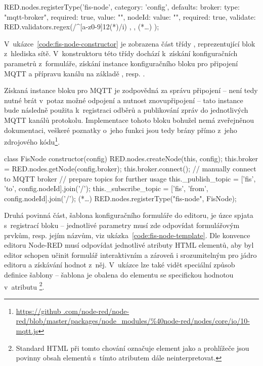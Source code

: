 \begin{code}[
    language=Javascript,
    label=code:fis-node-editor,
    caption={Registrace vlastního bloku do editoru sítě v~nástroji Node-RED.}
]
RED.nodes.registerType('fis-node', {
    category: 'config',
    defaults: {
        broker: {type: "mqtt-broker", required: true, value: ""},
        nodeId: {
            value: "", required: true,
            validate: RED.validators.regex(/^[a-z0-9]{12}(*\textdollar*)/i)
        },
    },
    (*\ldots*)
});
\end{code}

V~ukázce~\ref{code:fis-node-constructor} je zobrazena část třídy , reprezentující blok z~hlediska sítě.
V~konstruktoru této třídy dochází k~získání konfiguračních
parametrů z~formuláře, získání instance konfiguračního bloku pro připojení MQTT a přípravu kanálu na základě
, resp. .

Získaná instance bloku pro MQTT je zodpovědná za správu připojení -- není tedy nutné brát v~potaz možné odpojení a
nutnost znovupřipojení -- tato instance bude následně použita k~registraci odběrů a publikování zpráv do jednotlivých
MQTT kanálů protokolu.
Implementace tohoto bloku bohužel nemá zveřejněnou dokumentaci, veškeré poznatky o~jeho funkci jsou tedy brány přímo
z~jeho zdrojového kódu\footnote{\url{https://github
.com/node-red/node-red/blob/master/packages/node_modules/\%40node-red/nodes/core/io/10-mqtt.js}}.

\begin{code}[
    language=Javascript,
    numbers=left,
    label=code:fis-node-constructor,
    caption={Část konstruktoru třídy \ic{FisNode} obluhující připojení brokeru MQTT a přípravu kanálů pro komunikaci.}
]
class FisNode {
    constructor(config) {
        RED.nodes.createNode(this, config);
        this.broker = RED.nodes.getNode(config.broker);
        this.broker.connect(); // manually connect to MQTT broker
        // prepare topics for further usage
        this._publish_topic = ['fis', 'to', config.nodeId].join('/');
        this._subscribe_topic = ['fis', 'from', config.nodeId].join('/');
    }
    (*\ldots*)
    RED.nodes.registerType("fis-node", FisNode);
}
\end{code}


Druhá povinná část, šablona konfiguračního formuláře do editoru, je úzce spjata s~registrací bloku -- jednotlivé
parametry musí zde odpovídat formulářovým prvkům, resp. jejím názvům, viz ukázka~\ref{code:fis-node-template}.
Dle konvence editoru Node-RED musí odpovídat jednotlivé atributy HTML elementů, aby byl editor schopen učinit
formulář interaktivním a zároveň i srozumitelným pro jádro editoru a získávání hodnot z~něj.
V~ukázce lze také vidět speciální způsob definice šablony -- šablona je obalena do elementu  se
specifickou hodnotou v~atributu \footnote{Standard HTML při tomto chování označuje
element  jako  a prohlížeče jsou povinny obsah elementů s~tímto atributem dále
neinterpretovat.}.

